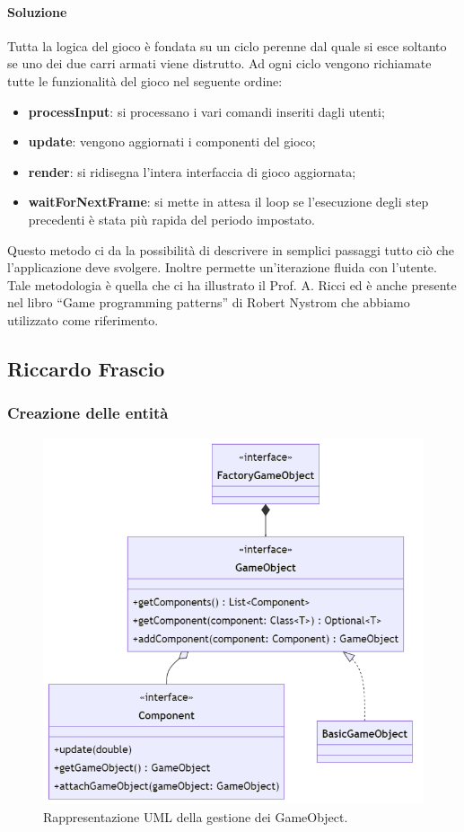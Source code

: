 \documentclass[a4paper,12pt]{report}
\begin{document}
\paragraph*{Soluzione} Tutta la logica del gioco è fondata su un ciclo perenne dal quale si esce soltanto se uno dei due carri armati viene distrutto. Ad ogni ciclo vengono richiamate tutte le funzionalità del gioco nel seguente ordine:
\begin{itemize}
	\item \textbf{processInput}:
	si processano i vari comandi inseriti dagli utenti;
	\item \textbf{update}:
	vengono aggiornati i componenti del gioco;
	\item \textbf{render}:
	si ridisegna l’intera interfaccia di gioco aggiornata;
	\item \textbf{waitForNextFrame}:
	si mette in attesa il loop se l’esecuzione degli step precedenti è stata più rapida del periodo impostato.
\end{itemize}
Questo metodo ci da la possibilità di descrivere in semplici passaggi tutto ciò che l’applicazione deve svolgere. Inoltre permette un’iterazione fluida con l’utente.
Tale metodologia è quella che ci ha illustrato il Prof. A. Ricci ed è anche presente nel libro “Game programming patterns” di Robert Nystrom che abbiamo utilizzato come riferimento.
%
\newpage
\subsection*{Riccardo Frascio}
%
\subsubsection*{Creazione delle entità}
%
\begin{figure}[H]
	\centering{}
	\includegraphics[scale=0.60]{img/gameObject.png}
	\caption{Rappresentazione UML della gestione dei GameObject.}
	\end{figure}
%
\end{document}
